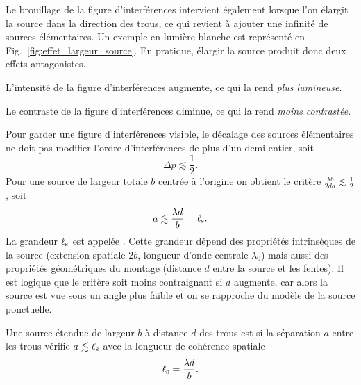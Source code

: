 \documentclass[12pt,fancy]{cours}
\begin{document}
Le brouillage de la figure d’interférences intervient également lorsque l’on élargit la source dans la direction des trous, ce qui revient à ajouter une infinité de sources élémentaires. Un exemple en lumière blanche est représenté en Fig.~\ref{fig:effet_largeur_source}. En pratique, élargir la source produit donc deux effets antagonistes.
\begin{liste}
\item L’intensité de la figure d'interférences augmente, ce qui la rend \emph{plus lumineuse}.
\item Le contraste de la figure d’interférences diminue, ce qui la rend \emph{moins contrastée}.
\end{liste}



Pour garder une figure d'interférences visible, le décalage des sources élémentaires ne doit pas modifier l'ordre d'interférences de plus d'un demi-entier, soit 
\begin{equation}
  \Delta p \lesssim \frac{1}{2}.
\end{equation}
Pour une source de largeur totale $b$ centrée à l'origine on obtient le critère $\frac{\lambda b}{2da} \lesssim \frac{1}{2}$, soit
\begin{equation}
  a \lesssim \frac{\lambda d}{b} = \ell_{\rm s}.
\end{equation}
La grandeur $\ell_{\rm s}$ est appelée .  Cette grandeur dépend des propriétés intrinsèques de la source (extension spatiale $2b$, longueur d'onde centrale $\lambda_0$) mais aussi des propriétés géométriques du montage (distance $d$ entre la source et les fentes). Il est logique que le critère soit moins contraignant si $d$ augmente, car alors la source est vue sous un angle plus faible et on se rapproche du modèle de la source ponctuelle.
\begin{prop}\label{prop:}
Une source étendue de largeur $b$ à distance $d$ des trous est  si la séparation $a$ entre les trous vérifie  $a \lesssim \ell_{\rm s}$ avec la longueur de cohérence spatiale
$$
\ell_{\rm s} = \frac{\lambda d}{b}.
$$
\end{prop}
\end{document}
